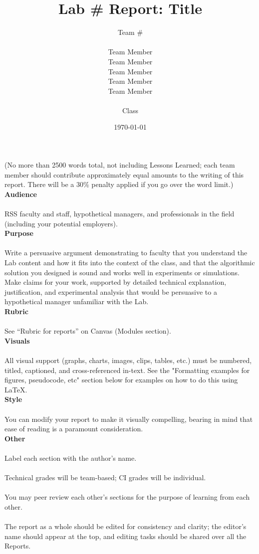 \documentclass{article}
\title{Lab \# Report: Title} %
\author{Team \# \\\\ Team Member \\ Team Member \\ Team Member \\ Team Member \\ Team Member \\\\ Class} %
\date{\today} %
\begin{document}
\maketitle

(No more than 2500 words total, not including Lessons Learned; each team member should contribute approximately equal amounts to the writing of this report. There will be a $30 \%$ penalty applied if you go over the word limit.)\\

\textbf{Audience}\\\\
RSS faculty and staff, hypothetical managers, and professionals in the field (including your potential employers).\\

\textbf{Purpose}\\\\
Write a persuasive argument demonstrating to faculty that you understand the Lab content and how it fits into the context of the class, and that the algorithmic solution you designed is sound and works well in experiments or simulations.  Make claims for your work, supported by detailed technical explanation, justification, and experimental analysis that would be persuasive to a hypothetical manager unfamiliar with the Lab.\\

\textbf{Rubric}\\\\
See “Rubric for reports” on Canvas (Modules section).\\

\textbf{Visuals}\\\\
All visual support (graphs, charts, images, clips, tables, etc.) must be numbered, titled, captioned, and cross-referenced in-text. See the "Formatting examples for figures, pseudocode, etc" section below for examples on how to do this using LaTeX.\\

\textbf{Style}\\\\
You can modify your report to make it visually compelling, bearing in mind that ease of reading is a paramount consideration.\\

\textbf{Other}\\\\
Label each section with the author’s name.\\\\
Technical grades will be team-based; CI grades will be individual.\\\\
You may peer review each other’s sections for the purpose of learning from each other.\\\\
The report as a whole should be edited for consistency and clarity; the editor’s name should appear at the top, and editing tasks should be shared over all the Reports.\\
\end{document}
